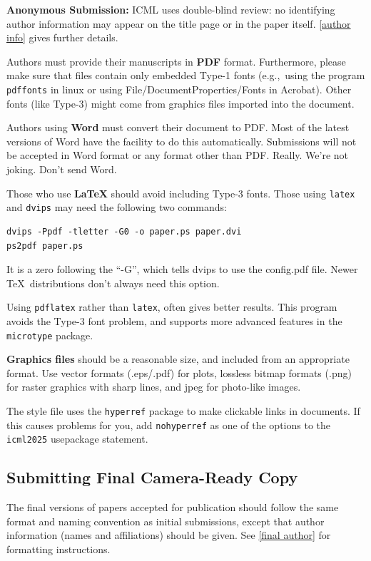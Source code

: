 \documentclass{article}
\theoremstyle{plain}
\theoremstyle{definition}
\theoremstyle{remark}
\begin{document}
\textbf{Anonymous Submission:} ICML uses double-blind review: no identifying
author information may appear on the title page or in the paper
itself. \cref{author info} gives further details.

\medskip

Authors must provide their manuscripts in \textbf{PDF} format.
Furthermore, please make sure that files contain only embedded Type-1 fonts
(e.g.,~using the program \texttt{pdffonts} in linux or using
File/DocumentProperties/Fonts in Acrobat). Other fonts (like Type-3)
might come from graphics files imported into the document.

Authors using \textbf{Word} must convert their document to PDF\@. Most
of the latest versions of Word have the facility to do this
automatically. Submissions will not be accepted in Word format or any
format other than PDF\@. Really. We're not joking. Don't send Word.

Those who use \textbf{\LaTeX} should avoid including Type-3 fonts.
Those using \texttt{latex} and \texttt{dvips} may need the following
two commands:

{\footnotesize
\begin{verbatim}
dvips -Ppdf -tletter -G0 -o paper.ps paper.dvi
ps2pdf paper.ps
\end{verbatim}}
It is a zero following the ``-G'', which tells dvips to use
the config.pdf file. Newer \TeX\ distributions don't always need this
option.

Using \texttt{pdflatex} rather than \texttt{latex}, often gives better
results. This program avoids the Type-3 font problem, and supports more
advanced features in the \texttt{microtype} package.

\textbf{Graphics files} should be a reasonable size, and included from
an appropriate format. Use vector formats (.eps/.pdf) for plots,
lossless bitmap formats (.png) for raster graphics with sharp lines, and
jpeg for photo-like images.

The style file uses the \texttt{hyperref} package to make clickable
links in documents. If this causes problems for you, add
\texttt{nohyperref} as one of the options to the \texttt{icml2025}
usepackage statement.


\subsection{Submitting Final Camera-Ready Copy}

The final versions of papers accepted for publication should follow the
same format and naming convention as initial submissions, except that
author information (names and affiliations) should be given. See
\cref{final author} for formatting instructions.
\end{document}
